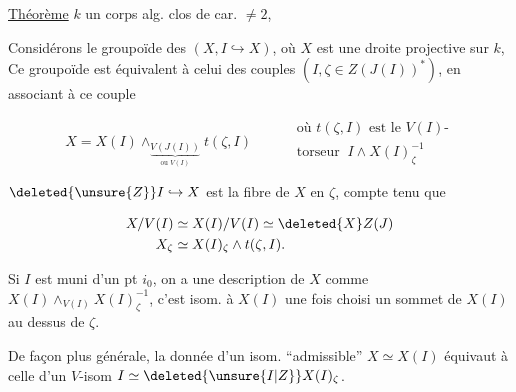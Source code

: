 
\uline{Théorème}  $k$ un corps alg. clos de car. $\ne 2$,  

Considérons le groupoïde des $(X,I\hookrightarrow X)$, où $X$ est une droite projective sur $k$,   Ce groupoïde est équivalent à celui des couples $(I,\zeta\in Z(J(I))^*)$, en associant à ce couple

\[
X=X(I)\wedge_{\underset{\text{ou }V(I)}{\underbrace{V(J(I))}}}t(\zeta,I)
\qquad\begin{aligned}&\text{où }t(\zeta,I)\text{ est le }V(I)\text{-}\\[-2pt]&\text{torseur }\ I\wedge X(I)_\zeta^{-1}\end{aligned}
\]

$\deleted{\unsure{Z}}I\hookrightarrow X$ est la fibre  de $X$ en $\zeta$, compte tenu que

\[
\begin{aligned}
X/V(I)&\simeq X(I)/V(I)\simeq\deleted{X}Z(J)\\
X_\zeta&\simeq X(I)_\zeta\wedge t(\zeta,I).
\end{aligned}
\]

 Si $I$ est muni d'un pt $i_0$, on a une description de $X$ comme $X(I)\wedge_{V(I)}X(I)_\zeta^{-1}$, c'est isom. à $X(I)$ une fois choisi un sommet de $X(I)$ au dessus de $\zeta$.

De façon plus générale,  la donnée d'un isom. ``admissible'' $X\simeq X(I)$ équivaut à celle d'un $V$-isom $I\simeq\deleted{\unsure{I|Z}}X(I)_\zeta$.
